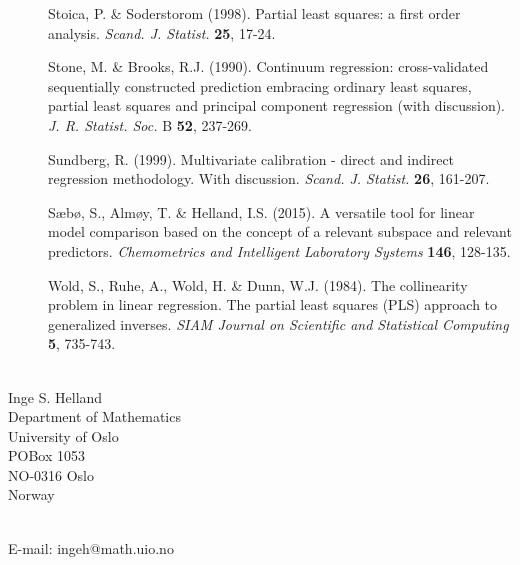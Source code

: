 \documentclass[11pt]{article}
\begin{document}
\begin{description}
\item[] Stoica, P. \& Soderstorom (1998). Partial least squares: a first order analysis. \textit{Scand. J. Statist.} \textbf{25}, 17-24.

\item[] Stone, M. \& Brooks, R.J. (1990). Continuum regression: cross-validated sequentially constructed prediction embracing ordinary least squares, partial least squares and principal component regression (with discussion). \textit{J. R. Statist. Soc.} B \textbf{52}, 237-269.

\item[] Sundberg, R. (1999). Multivariate calibration - direct and indirect regression methodology. With discussion. \textit{Scand. J. Statist.} \textbf{26}, 161-207.

\item[] S\ae b\o , S., Alm\o y, T. \& Helland, I.S. (2015). A versatile tool for linear model comparison based on the concept of a relevant subspace and relevant predictors. \textit{Chemometrics and Intelligent Laboratory Systems} \textbf{146}, 128-135.

\item[] Wold, S., Ruhe, A., Wold, H. \& Dunn, W.J. (1984). The collinearity problem in linear regression. The partial least squares (PLS) approach to generalized inverses. \textit{SIAM Journal on Scientific and Statistical Computing} \textbf{5}, 735-743.


\end{description}
\bigskip

\ \\Inge S. Helland\\ Department of Mathematics\\ University of Oslo\\ POBox 1053\\ NO-0316 Oslo\\ Norway

\ \\E-mail: ingeh@math.uio.no
\end{document}

